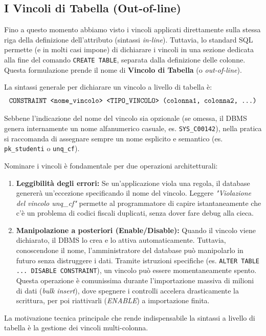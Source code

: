 \subsection{I Vincoli di Tabella (Out-of-line)}

Fino a questo momento abbiamo visto i vincoli applicati direttamente sulla stessa riga della definizione dell'attributo (sintassi \textit{in-line}). Tuttavia, lo standard SQL permette (e in molti casi impone) di dichiarare i vincoli in una sezione dedicata alla fine del comando \texttt{CREATE TABLE}, separata dalla definizione delle colonne. Questa formulazione prende il nome di \textbf{Vincolo di Tabella} (o \textit{out-of-line}).

La sintassi generale per dichiarare un vincolo a livello di tabella è:
$$ \texttt{CONSTRAINT <nome\_vincolo> <TIPO\_VINCOLO> (colonna1, colonna2, \dots)} $$

Sebbene l'indicazione del nome del vincolo sia opzionale (se omessa, il DBMS genera internamente un nome alfanumerico casuale, es. \texttt{SYS\_C00142}), nella pratica si raccomanda di assegnare sempre un nome esplicito e semantico (es. \texttt{pk\_studenti} o \texttt{unq\_cf}). 

Nominare i vincoli è fondamentale per due operazioni architetturali:
\begin{enumerate}
    \item \textbf{Leggibilità degli errori:} Se un'applicazione viola una regola, il database genererà un'eccezione specificando il nome del vincolo. Leggere \textit{"Violazione del vincolo unq\_cf"} permette al programmatore di capire istantaneamente che c'è un problema di codici fiscali duplicati, senza dover fare debug alla cieca.
    \item \textbf{Manipolazione a posteriori (Enable/Disable):} Quando il vincolo viene dichiarato, il DBMS lo crea e lo attiva automaticamente. Tuttavia, conoscendone il nome, l'amministratore del database può manipolarlo in futuro senza distruggere i dati. Tramite istruzioni specifiche (es. \texttt{ALTER TABLE ... DISABLE CONSTRAINT}), un vincolo può essere momentaneamente spento. Questa operazione è comunissima durante l'importazione massiva di milioni di dati (\textit{bulk insert}), dove spegnere i controlli accelera drasticamente la scrittura, per poi riattivarli (\textit{ENABLE}) a importazione finita.
\end{enumerate}

La motivazione tecnica principale che rende indispensabile la sintassi a livello di tabella è la gestione dei vincoli multi-colonna. 

